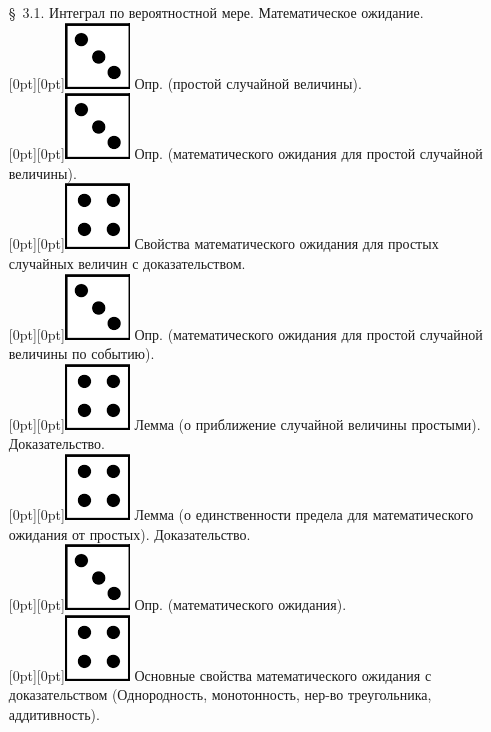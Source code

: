 \documentclass[10pt]{amsart}
\begin{document}
\begin{enumerate}
\begin{enumerate}
\item[\S\, 3.1.] Интеграл по вероятностной мере. Математическое ожидание. \\
 \raisebox{-1pt}[0pt][0pt]{\includegraphics[width=0.02\linewidth]{3.png}} Опр. (простой случайной величины). \\
 \raisebox{-1pt}[0pt][0pt]{\includegraphics[width=0.02\linewidth]{3.png}} Опр. (математического ожидания для простой случайной величины). \\
 \raisebox{-1pt}[0pt][0pt]{\includegraphics[width=0.02\linewidth]{4.png}} Свойства математического ожидания для  простых случайных величин с доказательством. \\
 \raisebox{-1pt}[0pt][0pt]{\includegraphics[width=0.02\linewidth]{3.png}} Опр. (математического ожидания для простой случайной величины по событию). \\
 \raisebox{-1pt}[0pt][0pt]{\includegraphics[width=0.02\linewidth]{4.png}} Лемма (о приближение случайной величины простыми). Доказательство. \\
 \raisebox{-1pt}[0pt][0pt]{\includegraphics[width=0.02\linewidth]{4.png}} Лемма (о единственности предела для математического ожидания от простых). Доказательство. \\ 
 \raisebox{-1pt}[0pt][0pt]{\includegraphics[width=0.02\linewidth]{3.png}} Опр. (математического ожидания). \\
 \raisebox{-1pt}[0pt][0pt]{\includegraphics[width=0.02\linewidth]{4.png}} Основные свойства математического ожидания с доказательством (Однородность, монотонность, нер-во треугольника, аддитивность). \\

\end{enumerate}
\end{enumerate}
\end{document}
